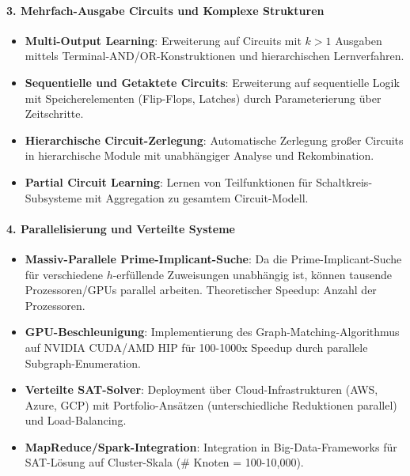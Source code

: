 ﻿\documentclass[a4paper,12pt]{article}
\theoremstyle{definition}
\begin{document}
\paragraph{3. Mehrfach-Ausgabe Circuits und Komplexe Strukturen}

\begin{itemize}
	\item \textbf{Multi-Output Learning}: Erweiterung auf Circuits mit $k > 1$ Ausgaben mittels Terminal-AND/OR-Konstruktionen und hierarchischen Lernverfahren.
	
	\item \textbf{Sequentielle und Getaktete Circuits}: Erweiterung auf sequentielle Logik mit Speicherelementen (Flip-Flops, Latches) durch Parameterierung über Zeitschritte.
	
	\item \textbf{Hierarchische Circuit-Zerlegung}: Automatische Zerlegung großer Circuits in hierarchische Module mit unabhängiger Analyse und Rekombination.
	
	\item \textbf{Partial Circuit Learning}: Lernen von Teilfunktionen für Schaltkreis-Subsysteme mit Aggregation zu gesamtem Circuit-Modell.
\end{itemize}

\paragraph{4. Parallelisierung und Verteilte Systeme}

\begin{itemize}
	\item \textbf{Massiv-Parallele Prime-Implicant-Suche}: Da die Prime-Implicant-Suche für verschiedene $h$-erfüllende Zuweisungen unabhängig ist, können tausende Prozessoren/GPUs parallel arbeiten. Theoretischer Speedup: Anzahl der Prozessoren.
	
	\item \textbf{GPU-Beschleunigung}: Implementierung des Graph-Matching-Algorithmus auf NVIDIA CUDA/AMD HIP für 100-1000x Speedup durch parallele Subgraph-Enume\-ration.
	
	\item \textbf{Verteilte SAT-Solver}: Deployment über Cloud-Infrastrukturen (AWS, Azure, GCP) mit Portfolio-Ansätzen (unterschiedliche Reduktionen parallel) und Load-Balancing.
	
	\item \textbf{MapReduce/Spark-Integration}: Integration in Big-Data-Frameworks für SAT-Lösung auf Cluster-Skala (\# Knoten = 100-10,000).
\end{itemize}
\end{document}
